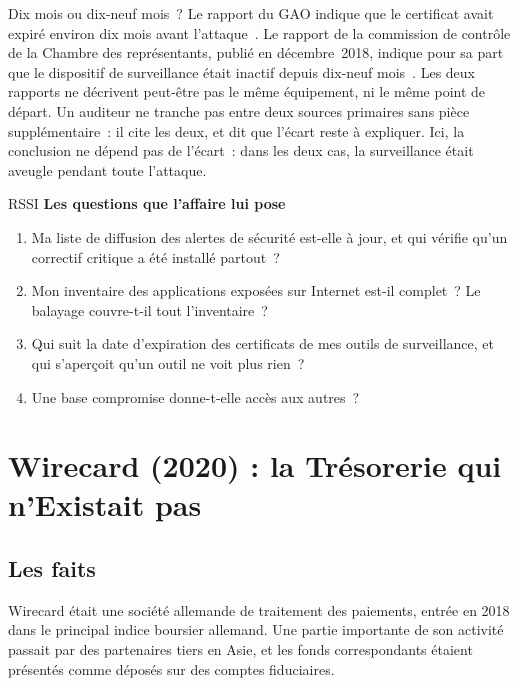 \begin{boiteRemarque}{Dix mois ou dix-neuf mois~?}
Le rapport du GAO indique que le certificat avait expiré environ dix mois
avant l'attaque~\cite{gao2018equifax}. Le rapport de la commission de
contrôle de la Chambre des représentants, publié en décembre~2018, indique
pour sa part que le dispositif de surveillance était inactif depuis
dix-neuf mois~\cite{house2018equifax}. Les deux rapports ne décrivent
peut-être pas le même équipement, ni le même point de départ. Un auditeur
ne tranche pas entre deux sources primaires sans pièce supplémentaire~: il
cite les deux, et dit que l'écart reste à expliquer. Ici, la conclusion
ne dépend pas de l'écart~: dans les deux cas, la surveillance était aveugle
pendant toute l'attaque.
\end{boiteRemarque}

\begin{boxmetier}{RSSI}
\textbf{Les questions que l'affaire lui pose}
\begin{enumerate}
    \item Ma liste de diffusion des alertes de sécurité est-elle à jour, et
          qui vérifie qu'un correctif critique a été installé partout~?
    \item Mon inventaire des applications exposées sur Internet est-il
          complet~? Le balayage couvre-t-il tout l'inventaire~?
    \item Qui suit la date d'expiration des certificats de mes outils de
          surveillance, et qui s'aperçoit qu'un outil ne voit plus rien~?
    \item Une base compromise donne-t-elle accès aux autres~?
\end{enumerate}
\end{boxmetier}

\section{Wirecard (2020) : la Trésorerie qui n'Existait pas}
\label{sec:c02-wirecard}

\subsection{Les faits}

Wirecard était une société allemande de traitement des paiements, entrée
en 2018 dans le principal indice boursier allemand. Une partie
importante de son activité passait par des partenaires tiers en Asie, et
les fonds correspondants étaient présentés comme déposés sur des comptes
fiduciaires.

